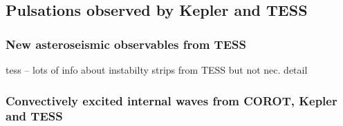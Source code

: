 {\color{blue}
\subsection{Pulsations observed by Kepler and TESS}



\subsubsection{New asteroseismic observables from TESS}

tess -- lots of info about instabilty strips from TESS but not nec. detail

\subsubsection{Convectively excited internal waves from COROT, Kepler and TESS}


}